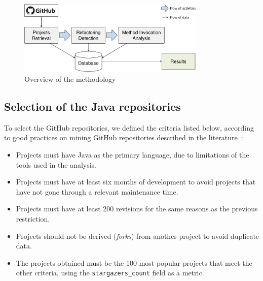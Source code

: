 \begin{figure}[htbp]\centering
\includegraphics[width=0.8\textwidth]{img/ch5/overview-en.pdf}
\caption{Overview of the methodology}
\label{ioverview}
\end{figure}

\subsection{Selection of the Java repositories}
\label{ssystems}

To select the GitHub repositories, we defined the criteria listed below, according to good practices on mining GitHub repositories described in the literature~\citep{kalliamvakou2014promises}:
\begin{itemize}
\item Projects must have Java as the primary language, due to limitations of the tools used in the analysis.
\item Projects must have at least six months of development to avoid projects that have not gone through a relevant maintenance time.
\item Projects must have at least 200 revisions for the same reasons as the previous restriction.
\item Projects should not be derived (\emph{forks}) from another project to avoid duplicate data.
\item The projects obtained must be the 100 most popular projects that meet the other criteria, using the \texttt{stargazers\_count} field as a metric.
\end{itemize}


